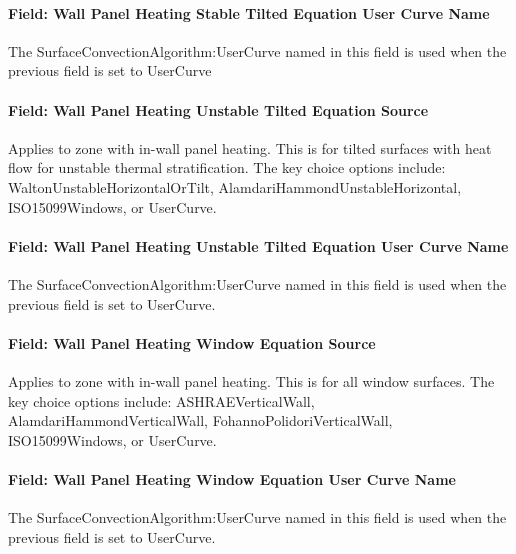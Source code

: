 \paragraph{Field: Wall Panel Heating Stable Tilted Equation User Curve Name}\label{field-wall-panel-heating-stable-tilted-equation-user-curve-name}

The SurfaceConvectionAlgorithm:UserCurve named in this field is used when the previous field is set to UserCurve

\paragraph{Field: Wall Panel Heating Unstable Tilted Equation Source}\label{field-wall-panel-heating-unstable-tilted-equation-source}

Applies to zone with in-wall panel heating. This is for tilted surfaces with heat flow for unstable thermal stratification. The key choice options include: WaltonUnstableHorizontalOrTilt, AlamdariHammondUnstableHorizontal, ISO15099Windows, or UserCurve.

\paragraph{Field: Wall Panel Heating Unstable Tilted Equation User Curve Name}\label{field-wall-panel-heating-unstable-tilted-equation-user-curve-name}

The SurfaceConvectionAlgorithm:UserCurve named in this field is used when the previous field is set to UserCurve.

\paragraph{Field: Wall Panel Heating Window Equation Source}\label{field-wall-panel-heating-window-equation-source}

Applies to zone with in-wall panel heating. This is for all window surfaces. The key choice options include: ASHRAEVerticalWall, AlamdariHammondVerticalWall, FohannoPolidoriVerticalWall, ISO15099Windows, or UserCurve.

\paragraph{Field: Wall Panel Heating Window Equation User Curve Name}\label{field-wall-panel-heating-window-equation-user-curve-name}

The SurfaceConvectionAlgorithm:UserCurve named in this field is used when the previous field is set to UserCurve.


